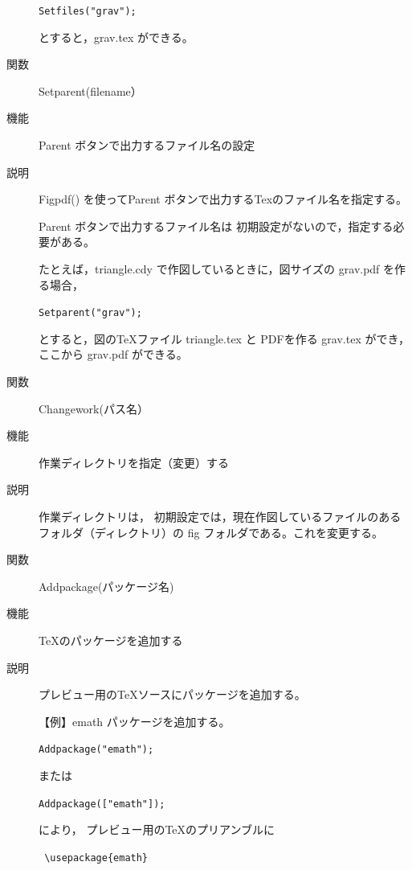 \documentclass[papersize,a4paper,12pt,uplatex]{jsarticle}
\begin{document}
\begin{description}
\hspace{10mm}  \verb|Setfiles("grav");|

とすると，grav.tex ができる。

\vspace{\baselineskip}
\hypertarget{setparent}{}
\item[関数]  Setparent(filename）
\item[機能]  Parent ボタンで出力するファイル名の設定
\item[説明]  Figpdf() を使ってParent ボタンで出力するTexのファイル名を指定する。

Parent ボタンで出力するファイル名は 初期設定がないので，指定する必要がある。

たとえば，triangle.cdy で作図しているときに，図サイズの grav.pdf を作る場合，

\hspace{10mm}   \verb|Setparent("grav");|

とすると，図のTeXファイル  triangle.tex と PDFを作る grav.tex ができ，ここから grav.pdf ができる。

\vspace{\baselineskip}
\hypertarget{changework}{}
\item[関数]  Changework(パス名）
\item[機能]  作業ディレクトリを指定（変更）する
\item[説明]  作業ディレクトリは， 初期設定では，現在作図しているファイルのあるフォルダ（ディレクトリ）の fig フォルダである。これを変更する。

\vspace{\baselineskip}
\hypertarget{addpackage}{}
\item[関数]  Addpackage(パッケージ名)
\item[機能]  TeXのパッケージを追加する
\item[説明]  プレビュー用のTeXソースにパッケージを追加する。 

\vspace{\baselineskip}
 【例】emath  パッケージを追加する。
 
\hspace{10mm}  \verb|Addpackage("emath"); | 
 
 または
 
\hspace{10mm}  \verb|Addpackage(["emath"]); | 
 
 により，
  プレビュー用のTeXのプリアンブルに
  
\hspace{10mm}  \verb| \usepackage{emath}|


\end{description}
\end{document}
